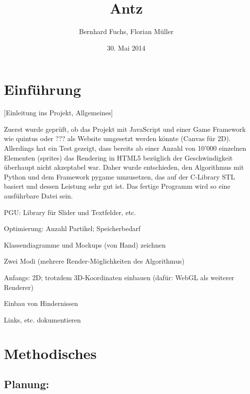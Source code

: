 \documentclass{article}
\title{Antz}
\author{Bernhard Fuchs, Florian Müller}
\date{30. Mai 2014}
\begin{document}
\maketitle





\section{Einführung}

[Einleitung ins Projekt, Allgemeines]

\vspace*{1cm}

Zuerst wurde geprüft, ob das Projekt mit JavaScript und einer Game Framework wie quintus oder ??? als Website umgesetzt werden könnte (Canvas für 2D). Allerdings hat ein Test gezeigt, dass bereits ab einer Anzahl von 10'000 einzelnen Elementen (sprites) das Rendering in HTML5 bezüglich der Geschwindigkeit überhaupt nicht akzeptabel war. Daher wurde entschieden, den Algorithmus mit Python und dem Framework pygame umzusetzen, das auf der C-Library STL basiert und dessen Leistung sehr gut ist. Das fertige Programm wird so eine ausführbare Datei sein.


\vspace*{1cm} 


\begin{compactitem}
\item PGU: Library für Slider und Textfelder, etc.
\item Optimierung: Anzahl Partikel; Speicherbedarf
\item Klassendiagramme und Mockups (von Hand) zeichnen
\item Zwei Modi (mehrere Render-Möglichkeiten des Algorithmus)
\item Anfangs: 2D; trotzdem 3D-Koordinaten einbauen (dafür: WebGL als weiterer Renderer)
\item Einbau von Hindernissen
\end{compactitem}


Links, etc. dokumentieren


\vspace*{1cm}


\section{Methodisches}


\subsection*{Planung:}
\end{document}
